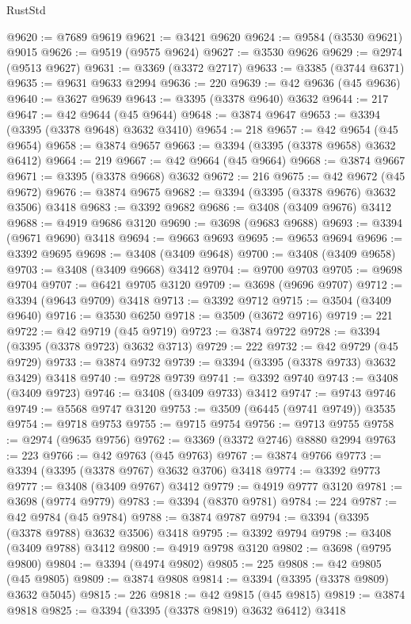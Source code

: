 \begin{lexlean}{RustStd}
\begin{coremodule}
@9620 := @7689 @9619
@9621 := @3421 @9620
@9624 := @9584 (@3530 @9621) @9015
@9626 := @9519 (@9575 @9624)
@9627 := @3530 @9626
@9629 := @2974 (@9513 @9627)
@9631 := @3369 (@3372 @2717)
@9633 := @3385 (@3744 @6371)
@9635 := @9631 @9633 @2994
@9636 := 220
@9639 := @42 @9636 (@45 @9636)
@9640 := @3627 @9639
@9643 := @3395 (@3378 @9640) @3632
@9644 := 217
@9647 := @42 @9644 (@45 @9644)
@9648 := @3874 @9647
@9653 := @3394 (@3395 (@3378 @9648) @3632 @3410)
@9654 := 218
@9657 := @42 @9654 (@45 @9654)
@9658 := @3874 @9657
@9663 := @3394 (@3395 (@3378 @9658) @3632 @6412)
@9664 := 219
@9667 := @42 @9664 (@45 @9664)
@9668 := @3874 @9667
@9671 := @3395 (@3378 @9668) @3632
@9672 := 216
@9675 := @42 @9672 (@45 @9672)
@9676 := @3874 @9675
@9682 := @3394 (@3395 (@3378 @9676) @3632 @3506) @3418
@9683 := @3392 @9682
@9686 := @3408 (@3409 @9676) @3412
@9688 := @4919 @9686 @3120
@9690 := @3698 (@9683 @9688)
@9693 := @3394 (@9671 @9690) @3418
@9694 := @9663 @9693
@9695 := @9653 @9694
@9696 := @3392 @9695
@9698 := @3408 (@3409 @9648)
@9700 := @3408 (@3409 @9658)
@9703 := @3408 (@3409 @9668) @3412
@9704 := @9700 @9703
@9705 := @9698 @9704
@9707 := @6421 @9705 @3120
@9709 := @3698 (@9696 @9707)
@9712 := @3394 (@9643 @9709) @3418
@9713 := @3392 @9712
@9715 := @3504 (@3409 @9640)
@9716 := @3530 @6250
@9718 := @3509 (@3672 @9716)
@9719 := 221
@9722 := @42 @9719 (@45 @9719)
@9723 := @3874 @9722
@9728 := @3394 (@3395 (@3378 @9723) @3632 @3713)
@9729 := 222
@9732 := @42 @9729 (@45 @9729)
@9733 := @3874 @9732
@9739 := @3394 (@3395 (@3378 @9733) @3632 @3429) @3418
@9740 := @9728 @9739
@9741 := @3392 @9740
@9743 := @3408 (@3409 @9723)
@9746 := @3408 (@3409 @9733) @3412
@9747 := @9743 @9746
@9749 := @5568 @9747 @3120
@9753 := @3509 (@6445 (@9741 @9749)) @3535
@9754 := @9718 @9753
@9755 := @9715 @9754
@9756 := @9713 @9755
@9758 := @2974 (@9635 @9756)
@9762 := @3369 (@3372 @2746) @8880 @2994
@9763 := 223
@9766 := @42 @9763 (@45 @9763)
@9767 := @3874 @9766
@9773 := @3394 (@3395 (@3378 @9767) @3632 @3706) @3418
@9774 := @3392 @9773
@9777 := @3408 (@3409 @9767) @3412
@9779 := @4919 @9777 @3120
@9781 := @3698 (@9774 @9779)
@9783 := @3394 (@8370 @9781)
@9784 := 224
@9787 := @42 @9784 (@45 @9784)
@9788 := @3874 @9787
@9794 := @3394 (@3395 (@3378 @9788) @3632 @3506) @3418
@9795 := @3392 @9794
@9798 := @3408 (@3409 @9788) @3412
@9800 := @4919 @9798 @3120
@9802 := @3698 (@9795 @9800)
@9804 := @3394 (@4974 @9802)
@9805 := 225
@9808 := @42 @9805 (@45 @9805)
@9809 := @3874 @9808
@9814 := @3394 (@3395 (@3378 @9809) @3632 @5045)
@9815 := 226
@9818 := @42 @9815 (@45 @9815)
@9819 := @3874 @9818
@9825 := @3394 (@3395 (@3378 @9819) @3632 @6412) @3418

\end{coremodule}
\end{lexlean}
